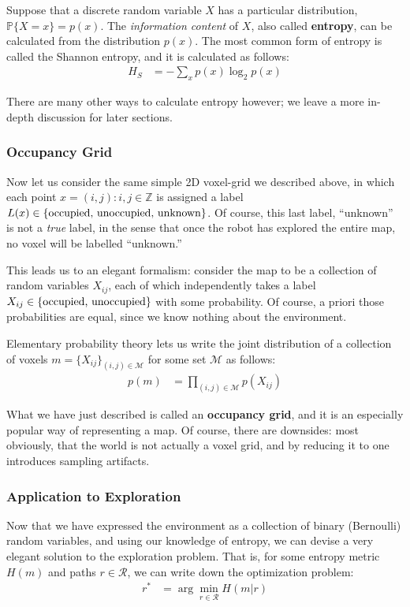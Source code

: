 \documentclass[12pt]{article}
\begin{document}
Suppose that a discrete random variable $X$ has a particular distribution, $\mathbb{P}\{X = x\} = p(x)$. The \textit{information content} of $X$, also called \textbf{entropy}, can be calculated from the distribution $p(x)$. The most common form of entropy is called the Shannon entropy, and it is calculated as follows:
\begin{align}
  H_S &= -\sum_x p(x) \log_2 p(x)
\end{align}

There are many other ways to calculate entropy however; we leave a more in-depth discussion for later sections.

\subsubsection{Occupancy Grid}

Now let us consider the same simple 2D voxel-grid we described above, in which each point $x = (i, j) : i,j \in \mathbb{Z}$ is assigned a label $L(x) \in \{\textnormal{occupied, unoccupied, unknown}\}$. Of course, this last label, ``unknown'' is not a \textit{true} label, in the sense that once the robot has explored the entire map, no voxel will be labelled ``unknown.''

This leads us to an elegant formalism: consider the map to be a collection of random variables $X_{ij}$, each of which independently takes a label $X_{ij} \in \{\textnormal{occupied, unoccupied}\}$ with some probability. Of course, a priori those probabilities are equal, since we know nothing about the environment.

Elementary probability theory lets us write the joint distribution of a collection of voxels $m = \{X_{ij}\}_{(i, j) \in \mathcal{M}}$ for some set $\mathcal{M}$ as follows:
\begin{align}
  p(m) &= \prod_{(i, j) \in \mathcal{M}} p(X_{ij})
\end{align}

What we have just described is called an \textbf{occupancy grid}, and it is an especially popular way of representing a map. Of course, there are downsides: most obviously, that the world is not actually a voxel grid, and by reducing it to one introduces sampling artifacts.

\subsubsection{Application to Exploration}

Now that we have expressed the environment as a collection of binary (Bernoulli) random variables, and using our knowledge of entropy, we can devise a very elegant solution to the exploration problem. That is, for some entropy metric $H(m)$ and paths $r \in \mathcal{R}$, we can write down the optimization problem:
\begin{align}
  r^* &= \arg \min_{r \in \mathcal{R}} H(m | r)
\end{align}
\end{document}
